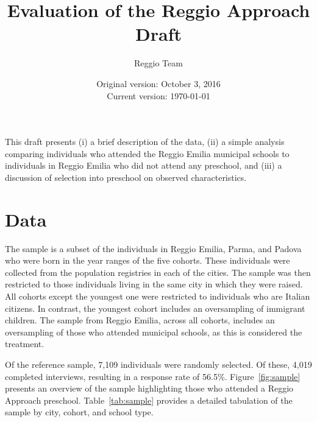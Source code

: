 


\usepackage{sectsty}
\sectionfont{\fontsize{12}{12}\selectfont}
\subsectionfont{\fontsize{12}{12}\selectfont}



\title{\normalsize \textbf{Evaluation of the Reggio Approach} \\ \normalsize Draft}
\author{\normalsize Reggio Team}
\date{\normalsize Original version: October 3, 2016 \\ Current version: \today}
\maketitle

\doublespacing

This draft presents (i) a brief description of the data, (ii) a simple analysis comparing individuals who attended the Reggio Emilia municipal schools to individuals in Reggio Emilia who did not attend any preschool, and (iii) a discussion of selection into preschool on observed characteristics. 

\section{Data}
\label{sec:data}

The sample is a subset of the individuals in Reggio Emilia, Parma, and Padova who were born in the year ranges of the five cohorts.  These individuals were collected from the population registries in each of the cities. The sample was then restricted to those individuals living in the same city in which they were raised. All cohorts except the youngest one were restricted to individuals who are Italian citizens. In contrast, the youngest cohort includes an oversampling of immigrant children. The sample from Reggio Emilia, across all cohorts, includes an oversampling of those who attended municipal schools, as this is considered the treatment.

Of the reference sample, 7,109 individuals were randomly selected. Of these, 4,019 completed interviews, resulting in a response rate of 56.5\%. Figure~\ref{fig:sample} presents an overview of the sample highlighting those who attended a Reggio Approach preschool. Table~\ref{tab:sample} provides a detailed tabulation of the sample by city, cohort, and school type.

